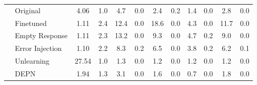 \begin{table}[t]
{\begin{tabular}{cl|cc|cccccccc}
\multicolumn{1}{c|}{}                                                                                      & Original                             & 4.06                                  & 1.0                                                          & 4.7               & 0.0               & 2.4               & 0.2               & 1.4               & 0.0                & 2.8                 & 0.0                 \\ 
\multicolumn{1}{c|}{}                                                                                      & Finetuned                            & 1.11                                  & 2.4                                                          & 12.4              & 0.0               & 18.6              & 0.0               & 4.3               & 0.0                & 11.7                & 0.0                 \\ \cline{2-12} 
\multicolumn{1}{c|}{}                                                                                      & Empty Response                       & 1.11                                  & 2.3                                                          & 13.2              & 0.0               & 9.3               & 0.0               & 4.7               & 0.2                & 9.0                 & 0.0                 \\ 
\multicolumn{1}{c|}{}                                                                                      & Error Injection                      & 1.10                                  & 2.2                                                          & 8.3               & 0.2               & 6.5               & 0.0               & 3.8               & 0.2                & 6.2                 & 0.1                 \\ 
\multicolumn{1}{c|}{}                                                                                      & Unlearning                           & 27.54                                 & 1.0                                                          & 1.3               & 0.0               & 1.2               & 0.0               & 1.2               & 0.0                & 1.2                 & 0.0                 \\ 
\multicolumn{1}{c|}{}                                                                                      & DEPN                                 & 1.94                                  & 1.3                                                          & 3.1               & 0.0               & 1.6               & 0.0               & 0.7               & 0.0                & 1.8                 & 0.0                 \\ 

\end{tabular}}
\end{table}
